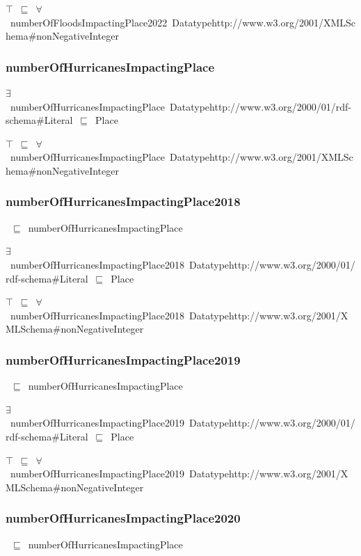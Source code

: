 \documentclass{article}
\begin{document}
\ensuremath{\top}~\ensuremath{\sqsubseteq}~\ensuremath{\forall}~numberOfFloodsImpactingPlace2022~Datatypehttp://www.w3.org/2001/XMLSchema#nonNegativeInteger

\subsubsection*{numberOfHurricanesImpactingPlace}

\ensuremath{\exists}~numberOfHurricanesImpactingPlace~Datatypehttp://www.w3.org/2000/01/rdf-schema#Literal~\ensuremath{\sqsubseteq}~Place

\ensuremath{\top}~\ensuremath{\sqsubseteq}~\ensuremath{\forall}~numberOfHurricanesImpactingPlace~Datatypehttp://www.w3.org/2001/XMLSchema#nonNegativeInteger

\subsubsection*{numberOfHurricanesImpactingPlace2018}

~\ensuremath{\sqsubseteq}~numberOfHurricanesImpactingPlace

\ensuremath{\exists}~numberOfHurricanesImpactingPlace2018~Datatypehttp://www.w3.org/2000/01/rdf-schema#Literal~\ensuremath{\sqsubseteq}~Place

\ensuremath{\top}~\ensuremath{\sqsubseteq}~\ensuremath{\forall}~numberOfHurricanesImpactingPlace2018~Datatypehttp://www.w3.org/2001/XMLSchema#nonNegativeInteger

\subsubsection*{numberOfHurricanesImpactingPlace2019}

~\ensuremath{\sqsubseteq}~numberOfHurricanesImpactingPlace

\ensuremath{\exists}~numberOfHurricanesImpactingPlace2019~Datatypehttp://www.w3.org/2000/01/rdf-schema#Literal~\ensuremath{\sqsubseteq}~Place

\ensuremath{\top}~\ensuremath{\sqsubseteq}~\ensuremath{\forall}~numberOfHurricanesImpactingPlace2019~Datatypehttp://www.w3.org/2001/XMLSchema#nonNegativeInteger

\subsubsection*{numberOfHurricanesImpactingPlace2020}

~\ensuremath{\sqsubseteq}~numberOfHurricanesImpactingPlace
\end{document}

